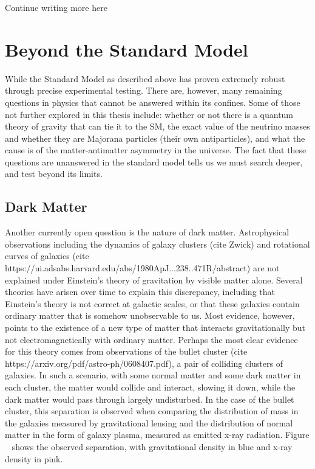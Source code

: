 Continue writing more here

\section{Beyond the Standard Model}
While the Standard Model as described above has proven extremely robust through precise experimental testing. There are, however, many remaining questions in physics that cannot be answered within its confines. Some of those not further explored in this thesis include: whether or not there is a quantum theory of gravity that can tie it to the SM, the exact value of the neutrino masses and whether they are Majorana particles (their own antiparticles), and what the cause is of the matter-antimatter asymmetry in the universe. The fact that these questions are unanswered in the standard model tells us we must search deeper, and test beyond its limits.

\subsection{Dark Matter}
Another currently open question is the nature of dark matter. Astrophysical observations including the dynamics of galaxy clusters (cite Zwick) and rotational curves of galaxies (cite https://ui.adsabs.harvard.edu/abs/1980ApJ...238..471R/abstract) are not explained under Einstein's theory of gravitation by visible matter alone. Several theories have arisen over time to explain this discrepancy, including that Einstein's theory is not correct at galactic scales, or that these galaxies contain ordinary matter that is somehow unobservable to us. Most evidence, however, points to the existence of a new type of matter that interacts gravitationally but not electromagnetically with ordinary matter. Perhaps the most clear evidence for this theory comes from observations of the bullet cluster (cite https://arxiv.org/pdf/astro-ph/0608407.pdf), a pair of colliding clusters of galaxies. In such a scenario, with some normal matter and some dark matter in each cluster, the matter would collide and interact, slowing it down, while the dark matter would pass through largely undisturbed. In the case of the bullet cluster, this separation is observed when comparing the distribution of mass in the galaxies measured by gravitational lensing and the distribution of normal matter in the form of galaxy plasma, measured as emitted x-ray radiation. Figure ~ shows the observed separation, with gravitational density in blue and x-ray density in pink.


